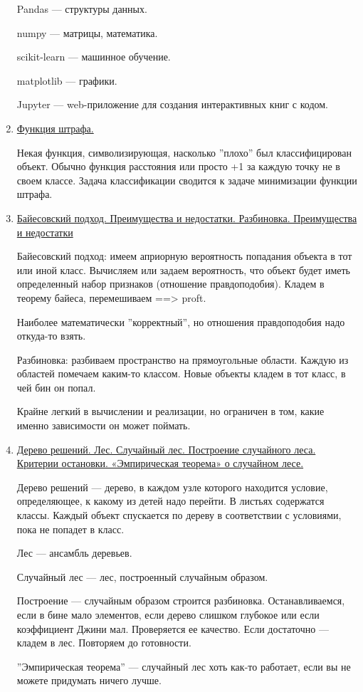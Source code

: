 \documentclass{proc}
\begin{document}
\begin{enumerate}
		Pandas --- структуры данных.
		
		numpy --- матрицы, математика.
		
		scikit-learn --- машинное обучение.
		
		matplotlib --- графики.
		
		Jupyter --- web-приложение для создания интерактивных книг с кодом.
		
		\item \uline{Функция штрафа.}
		
		Некая функция, символизирующая, насколько ''плохо'' был классифицирован объект. Обычно функция расстояния или просто +1 за каждую точку не в своем классе. Задача классификации сводится к задаче минимизации функции штрафа.
		
		\item \uline{Байесовский подход. Преимущества и недостатки. Разбиновка. Преимущества и недостатки}
		
		Байесовский подход: имеем априорную вероятность попадания объекта в тот или иной класс. Вычисляем или задаем вероятность, что объект будет иметь определенный набор признаков (отношение правдоподобия). Кладем в теорему байеса, перемешиваем ==> proft.
		
		Наиболее математически ''корректный'', но отношения правдоподобия надо откуда-то взять.
		
		Разбиновка: разбиваем пространство на прямоугольные области. Каждую из областей помечаем каким-то классом. Новые объекты кладем в тот класс, в чей бин он попал.
		
		Крайне легкий в вычислении и реализации, но ограничен в том, какие именно зависимости он может поймать.
		
		\item \uline{Дерево решений. Лес. Случайный лес. Построение случайного леса. Критерии остановки. «Эмпирическая теорема» о случайном лесе.}
		
		Дерево решений --- дерево, в каждом узле которого находится условие, определяющее, к какому из детей надо перейти. В листьях содержатся классы. Каждый объект спускается по дереву в соответствии с условиями, пока не попадет в класс.
		
		Лес --- ансамбль деревьев.
		
		Случайный лес --- лес, построенный случайным образом.
		
		Построение --- случайным образом строится разбиновка. Останавливаемся, если в бине мало элементов, если дерево слишком глубокое или если коэффициент Джини мал. Проверяется ее качество. Если достаточно --- кладем в лес. Повторяем до готовности.
		
		''Эмпирическая теорема'' --- случайный лес хоть как-то работает, если вы не можете придумать ничего лучше.
		
	\end{enumerate}
\end{document}

